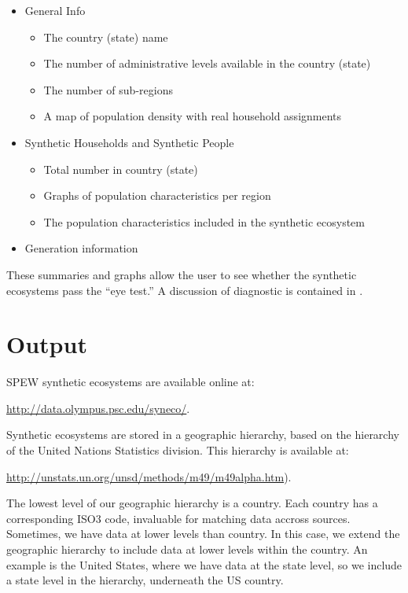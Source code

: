 \documentclass[font=9pt]{article}
\begin{document}
\begin{itemize}
  \item General Info
    \begin{itemize}
    \item The country (state) name 
    \item The number of administrative levels available in the country (state)
    \item The number of sub-regions
    \item A map of population density with real household assignments
    \end{itemize}
  \item Synthetic Households and Synthetic People
    \begin{itemize}
  \item Total number in country (state)
  \item Graphs of population characteristics per region
  \item The population characteristics included in the synthetic ecosystem
    \end{itemize}
  \item Generation information
\end{itemize}

\noindent These summaries and graphs allow the user to see whether the synthetic ecosystems pass the ``eye test.'' A discussion of diagnostic is contained in \cite{spew}. 

\newpage
\section{Output}
\label{sec:output}
SPEW synthetic ecosystems are available online at: 

\vspace{2mm}
	\url{http://data.olympus.psc.edu/syneco/}. 
\vspace{2mm}

Synthetic ecosystems are stored in a geographic hierarchy, based on the hierarchy of the United Nations Statistics division. This hierarchy is available at: 
	
\vspace{2mm}
	\url{http://unstats.un.org/unsd/methods/m49/m49alpha.htm}). 
\vspace{2mm}

The lowest level of our geographic hierarchy is a country. Each country has a corresponding ISO3 code, invaluable for matching data accross sources. Sometimes, we have data at lower levels than country. In this case, we extend the geographic hierarchy to include data at lower levels within the country. An example is the United States, where we have data at the state level, so we include a state level in the hierarchy, underneath the US country.
\end{document}

